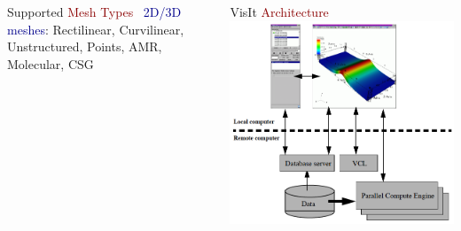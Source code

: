 \begin{frame}
\begin{columns}
\begin{column}{5.5cm}
\begin{beamerboxesrounded}[upper=block head,lower=block body,shadow=true]{ Supported \textcolor{DarkRed}{Mesh Types} }
        ~\textcolor{DarkBlue}{2D/3D meshes}: Rectilinear, Curvilinear, Unstructured, Points, AMR, Molecular, CSG
\end{beamerboxesrounded}
\end{column}
\begin{column}{6.25cm}
\pause
\begin{beamerboxesrounded}[upper=block head,lower=block body,shadow=true]{ VisIt \textcolor{DarkRed}{Architecture} }
        \includegraphics[width=\columnwidth]{figs/visit-guis/VisIt_arch}
\end{beamerboxesrounded}
\end{column}
\end{columns}

\end{frame}



